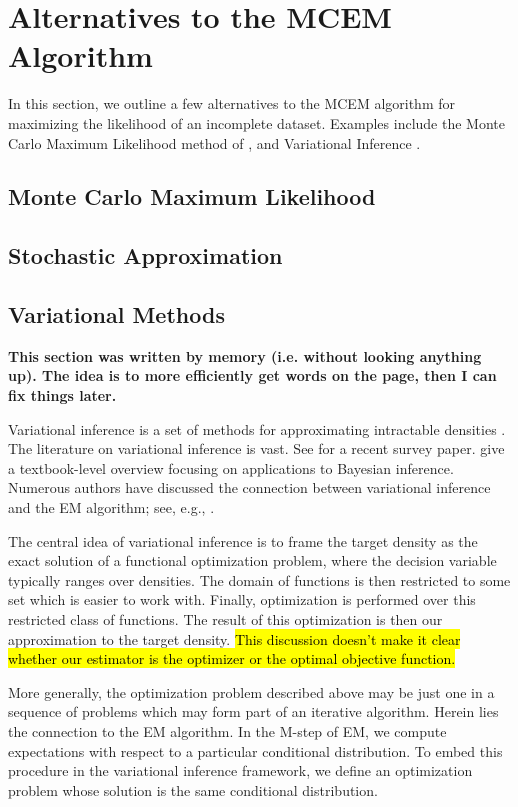 \documentclass[11pt, oneside]{article}   	%
\begin{document}
\section{Alternatives to the MCEM Algorithm}

In this section, we outline a few alternatives to the MCEM algorithm for maximizing the likelihood of an incomplete dataset. Examples include the Monte Carlo Maximum Likelihood method of \citet{Gey94}, and Variational Inference \citep{Ble17, Tsi08}.

\subsection{Monte Carlo Maximum Likelihood}



\subsection{Stochastic Approximation}

\subsection{Variational Methods}

\textbf{This section was written by memory (i.e. without looking anything up). The idea is to more efficiently get words on the page, then I can fix things later.}

Variational inference is a set of methods for approximating intractable densities \citep{need}. The literature on variational inference is vast. See \citet{Ble17} for a recent survey paper. \citet[Section 13.7]{Gel13} give a textbook-level overview focusing on applications to Bayesian inference. Numerous authors have discussed the connection between variational inference and the EM algorithm; see, e.g., \citet{Nea98,Tsi08}.

The central idea of variational inference is to frame the target density as the exact solution of a functional optimization problem, where the decision variable typically ranges over densities. The domain of functions is then restricted to some set which is easier to work with. Finally, optimization is performed over this restricted class of functions. The result of this optimization is then our approximation to the target density. \hl{This discussion doesn't make it clear whether our estimator is the optimizer or the optimal objective function.} 

More generally, the optimization problem described above may be just one in a sequence of problems which may form part of an iterative algorithm. Herein lies the connection to the EM algorithm. In the M-step of EM, we compute expectations with respect to a particular conditional distribution. To embed this procedure in the variational inference framework, we define an optimization problem whose solution is the same conditional distribution.
\end{document}
